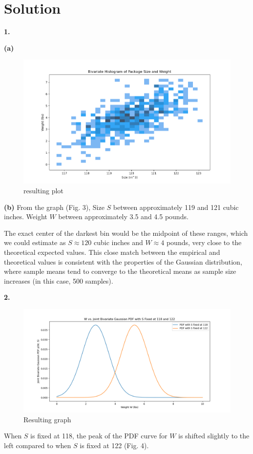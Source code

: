 \documentclass{harvardml}
\theoremstyle{definition}
\theoremstyle{plain}
\newenvironment{solution}
  {\color{blue}\section*{Solution}}
{}
\begin{document}
\begin{solution}
\color{black}
\noindent \textbf{1.}

\bigskip
\noindent \textbf{(a)}

\begin{figure}[h]
    \centering
    \includegraphics[width=1\linewidth]{histogram.png}
    \caption{resulting plot}
    \label{fig:enter-label}
\end{figure}

\noindent \textbf{(b)}
From the graph (Fig. 3),
Size \(S\) between approximately 119 and 121 cubic inches.
Weight \(W\) between approximately 3.5 and 4.5 pounds.

\medskip
The exact center of the darkest bin would be the midpoint of these ranges, which we could estimate as \(S \approx 120\) cubic inches and \(W \approx 4\) pounds, very close to the theoretical expected values. This close match between the empirical and theoretical values is consistent with the properties of the Gaussian distribution, where sample means tend to converge to the theoretical means as sample size increases (in this case, 500 samples).

\bigskip
\noindent \textbf{2.}

\begin{figure}[h]
    \centering
    \includegraphics[width=0.75\linewidth]{mow.png}
    \caption{Resulting graph}
    \label{fig:enter-label}
\end{figure}
When \( S \) is fixed at 118, the peak of the PDF curve for \( W \) is shifted slightly to the left compared to when \( S \) is fixed at 122 (Fig. 4).


\end{solution}
\end{document}

